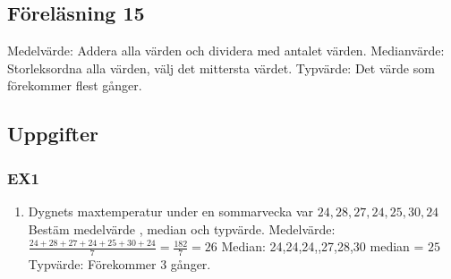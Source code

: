 \documentclass[a4paper,10pt]{article}
\newcommand*\circled[1]{\tikz[baseline=(char.base)]{
              \node[shape=circle,draw,inner sep=2pt] (char) {#1};}}
\begin{document}
\begin{flushleft}
\section{Föreläsning 15}
  Medelvärde: Addera alla värden och dividera med antalet värden.\newline
  Medianvärde: Storleksordna alla värden, välj det mittersta värdet.\newline
  Typvärde: Det värde som förekommer flest gånger.\newline
  \subsection{Uppgifter}
    \subsubsection{EX1}
    \begin{enumerate}
      \item Dygnets maxtemperatur under en sommarvecka var $24,28,27,24,25,30,24$\newline
      Bestäm medelvärde , median och typvärde.\newline
      Medelvärde: $ \frac{24+28+27+24+25+30+24}{7} = \frac{182}{7} = 26 $\newline
      Median:  24,24,24,\circled{25},27,28,30  median = $25$\newline
      Typvärde: Förekommer 3 gånger.\newline
    \end{enumerate}

\end{flushleft}
\end{document}
